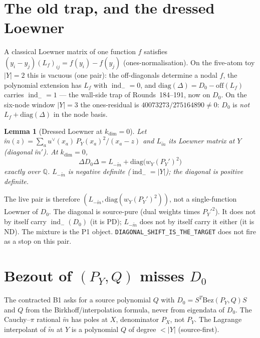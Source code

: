 \documentclass[11pt]{article}
\newtheorem{lemma}{Lemma}
\theoremstyle{remark}
\newcommand{\indm}{\operatorname{ind}_{-}}
\begin{document}
\section{The old trap, and the dressed Loewner}

A classical Loewner matrix of one function $f$ satisfies
$(y_i-y_j)(L_f)_{ij}=f(y_i)-f(y_j)$ (ones-normalisation).
On the five-atom toy $\lvert Y\rvert=2$ this is vacuous
(one pair): the off-diagonals determine a nodal $f$, the
polynomial extension has $L_f$ with $\indm=0$, and
$\mathrm{diag}(\Delta)=D_0-\mathrm{off}(L_f)$ carries
$\indm=1$ --- the wall-side trap of Rounds~184--191,
now on $D_0$.
On the six-node window $\lvert Y\rvert=3$ the ones-residual
is $40073273/275164890\neq 0$: $D_0$ is \emph{not}
$L_f+\mathrm{diag}(\Delta)$ in the node basis.

\begin{lemma}[Dressed Loewner at $k_{\dim}=0$]\label{lem:dress}
Let $\widetilde{m}(z)=\sum_a u^\vee(x_a)\,P_Y(x_a)^2/(x_a-z)$
and $L_{\widetilde{m}}$ its Loewner matrix at $Y$
(diagonal $\widetilde{m}'$).
At $k_{\dim}=0$,
\begin{equation}\label{eq:dress}
\Delta D_0\Delta
=L_{-\widetilde{m}}+\mathrm{diag}\bigl(w_Y(P_Y')^2\bigr)
\end{equation}
exactly over $\mathbb{Q}$.
$L_{-\widetilde{m}}$ is negative definite ($\indm=\lvert Y\rvert$);
the diagonal is positive definite.
\end{lemma}

The live pair is therefore $(L_{-\widetilde{m}},\mathrm{diag}(w_Y(P_Y')^2))$,
not a single-function Loewner of $D_0$.
The diagonal is source-pure (dual weights times $P_Y'^2$).
It does not by itself carry $\indm(D_0)$ (it is PD);
$L_{-\widetilde{m}}$ does not by itself carry it either
(it is ND).
The mixture is the P1 object.
\texttt{DIAGONAL\_SHIFT\_IS\_THE\_TARGET} does not fire
as a stop on this pair.

\section{Bezout of $(P_Y,Q)$ misses $D_0$}

The contracted B1 asks for a source polynomial $Q$ with
$D_0=S^T\mathrm{Bez}(P_Y,Q)S$ and $Q$ from the
Birkhoff/interpolation formula, never from eigendata of
$D_0$.
The Cauchy--$\pi$ rational $\widetilde{m}$ has poles at
$X$, denominator $P_X$, not $P_Y$.
The Lagrange interpolant of $\widetilde{m}$ at $Y$ is a
polynomial $Q$ of degree $<\lvert Y\rvert$ (source-first).
\end{document}
